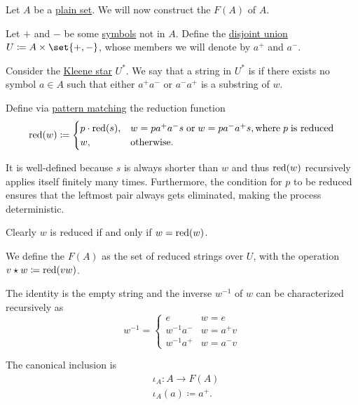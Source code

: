 \begin{definition}\label{def:free_group}\mimprovised
  Let \( A \) be a \hyperref[def:set]{plain set}. We will now construct the  \( F(A) \) of \( A \).

  Let \( + \) and \( - \) be some \hyperref[def:formal_language/symbol]{symbols} not in \( A \). Define the \hyperref[def:disjoint_union]{disjoint union} \( U \coloneqq A \times \set{ +, - } \), whose members we will denote by \( a^+ \) and \( a^- \).

  Consider the \hyperref[def:formal_language/kleene_star]{Kleene star} \( U^* \). We say that a string in \( U^* \) is  if there exists no symbol \( a \in A \) such that either \( a^+ a^- \) or \( a^- a^+ \) is a substring of \( w \).

  Define via \hyperref[con:evaluation]{pattern matching} the reduction function
  \begin{equation}\label{eq:def:free_group/reduction}
    \red(w) \coloneqq \begin{cases}
      p \cdot \red(s), &w = p a^+ a^- s \T{or} w = p a^- a^+ s, \T{where} p \T{is reduced} \\
      w,               &\T{otherwise.}
    \end{cases}
  \end{equation}

  It is well-defined because \( s \) is always shorter than \( w \) and thus \( \operatorname{red}(w) \) recursively applies itself finitely many times. Furthermore, the condition for \( p \) to be reduced ensures that the leftmost pair always gets eliminated, making the process deterministic.

  Clearly \( w \) is reduced if and only if \( w = \operatorname{red}(w) \).

  We define the  \( F(A) \) as the set of reduced strings over \( U \), with the operation \( v \star w \coloneqq \operatorname{red}(vw) \).

  The identity is the empty string and the inverse \( w^{-1} \) of \( w \) can be characterized recursively as
  \begin{equation*}
    w^{-1} = \begin{cases}
      e          &w = e \\
      w^{-1} a^- &w = a^+ v \\
      w^{-1} a^+ &w = a^- v
    \end{cases}
  \end{equation*}

  The canonical inclusion is
  \begin{equation*}
    \begin{aligned}
      &\iota_A: A \to F(A) \\
      &\iota_A(a) \coloneqq a^+.
    \end{aligned}
  \end{equation*}
\end{definition}
